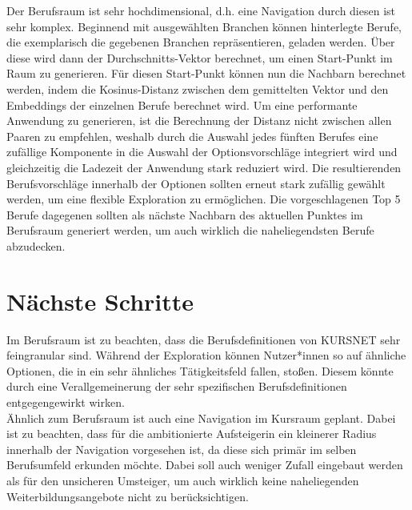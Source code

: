 \documentclass[10pt]{article}
\begin{document}
Der Berufsraum ist sehr hochdimensional, d.h. eine Navigation durch diesen ist
sehr komplex. Beginnend mit ausgewählten Branchen können hinterlegte Berufe, die
exemplarisch die gegebenen Branchen repräsentieren, geladen werden. Über diese
wird dann der Durchschnitts-Vektor berechnet, um einen Start-Punkt im Raum zu
generieren. Für diesen Start-Punkt können nun die Nachbarn berechnet werden,
indem die Kosinus-Distanz zwischen dem gemittelten Vektor und den Embeddings der
einzelnen Berufe berechnet wird. Um eine performante Anwendung zu generieren,
ist die Berechnung der Distanz nicht zwischen allen Paaren zu empfehlen, weshalb
durch die Auswahl jedes fünften Berufes eine zufällige Komponente in die Auswahl
der Optionsvorschläge integriert wird und gleichzeitig die Ladezeit der
Anwendung stark reduziert wird. Die resultierenden Berufsvorschläge innerhalb
der Optionen sollten erneut stark zufällig gewählt werden, um eine flexible
Exploration zu ermöglichen. Die vorgeschlagenen Top 5 Berufe dagegenen sollten
als nächste Nachbarn des aktuellen Punktes im Berufsraum generiert werden, um
auch wirklich die naheliegendsten Berufe abzudecken.

\section{Nächste Schritte}

Im Berufsraum ist zu beachten, dass die Berufsdefinitionen von KURSNET sehr
feingranular sind. Während der Exploration können Nutzer*innen so auf ähnliche
Optionen, die in ein sehr ähnliches Tätigkeitsfeld fallen, stoßen. Diesem könnte
durch eine Verallgemeinerung der sehr spezifischen Berufsdefinitionen
entgegengewirkt wirken.\\

Ähnlich zum Berufsraum ist auch eine Navigation im Kursraum geplant. Dabei ist
zu beachten, dass für die ambitionierte Aufsteigerin ein kleinerer Radius
innerhalb der Navigation vorgesehen ist, da diese sich primär im selben
Berufsumfeld erkunden möchte. Dabei soll auch weniger Zufall eingebaut werden
als für den unsicheren Umsteiger, um auch wirklich keine naheliegenden
Weiterbildungsangebote nicht zu berücksichtigen.\\
\end{document}

